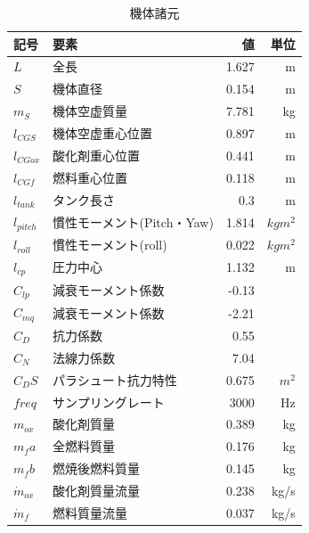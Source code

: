 \documentclass[a4paper]{jarticle}
\begin{document}
\begin{table}[H]
  \centering
  \begin{tabular}{|l|l|r|r|} \hline
    記号 & 要素　& 値 & 単位 \\ \hline
    $L$ & 全長 & 1.627 & m \\ \hline
    $S$ & 機体直径 & 0.154 & m \\ \hline
    $m_S$ & 機体空虚質量 & 7.781 & kg \\ \hline
    $l_{CGS}$ & 機体空虚重心位置 & 0.897 & m \\ \hline
    $l_{CGox}$ & 酸化剤重心位置 & 0.441 & m \\ \hline
    $l_{CGf}$ & 燃料重心位置 & 0.118 & m \\ \hline
    $l_{tank}$ & タンク長さ & 0.3 & m \\ \hline
    $l_{pitch}$ & 慣性モーメント(Pitch・Yaw) & 1.814 & $kgm^2$ \\ \hline
    $l_{roll}$ & 慣性モーメント(roll) & 0.022 & $kgm^2$ \\ \hline
    $l_{cp}$ & 圧力中心 & 1.132 & m \\ \hline
    $C_{lp}$ & 減衰モーメント係数 & -0.13 &  \\ \hline
    $C_{mq}$ & 減衰モーメント係数 & -2.21 & \\ \hline
    $C_D$ & 抗力係数 & 0.55 & \\ \hline
    $C_{N}$ & 法線力係数 & 7.04 & \\ \hline 
    $C_DS$ & パラシュート抗力特性 & 0.675 & $m^2$ \\ \hline
    $freq$ & サンプリングレート & 3000 & Hz \\ \hline
    $m_{ox}$ & 酸化剤質量 & 0.389 & kg \\ \hline
    $m_fa$ & 全燃料質量 & 0.176 & kg \\ \hline
    $m_fb$ & 燃焼後燃料質量 & 0.145 & kg \\ \hline
    $\dot m_{ox}$ & 酸化剤質量流量　& 0.238 & kg/s \\ \hline
    $\dot m_f$ & 燃料質量流量 & 0.037 & kg/s \\ \hline
  \end{tabular}
  \caption{機体諸元}
\end{table}

\newpage
\end{document}
